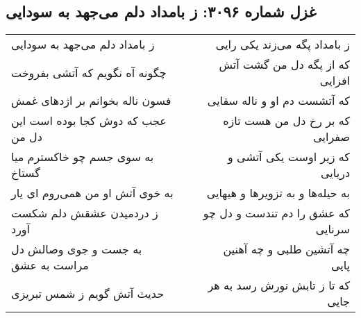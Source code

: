 \begin{center}
\section*{غزل شماره ۳۰۹۶: ز بامداد دلم می‌جهد به سودایی}
\label{sec:3096}
\begin{longtable}{l p{0.5cm} r}
ز بامداد دلم می‌جهد به سودایی
&&
ز بامداد پگه می‌زند یکی رایی
\\
چگونه آه نگویم که آتشی بفروخت
&&
که از پگه دل من گشت آتش افزایی
\\
فسون ناله بخوانم بر اژدهای غمش
&&
که آتشست دم او و ناله سقایی
\\
عجب که دوش کجا بوده است این دل من
&&
که بر رخ دل من هست تازه صفرایی
\\
به سوی جسم چو خاکسترم میا گستاخ
&&
که زیر اوست یکی آتشی و دریایی
\\
به خوی آتش او من همی‌روم ای یار
&&
به حیله‌ها و به تزویرها و هیهایی
\\
ز دردمیدن عشقش دلم شکست آورد
&&
که عشق را دم تندست و دل چو سرنایی
\\
به جست و جوی وصالش دل مراست به عشق
&&
چه آتشین طلبی و چه آهنین پایی
\\
حدیث آتش گویم ز شمس تبریزی
&&
که تا ز تابش نورش رسد به هر جایی
\\
\end{longtable}
\end{center}
